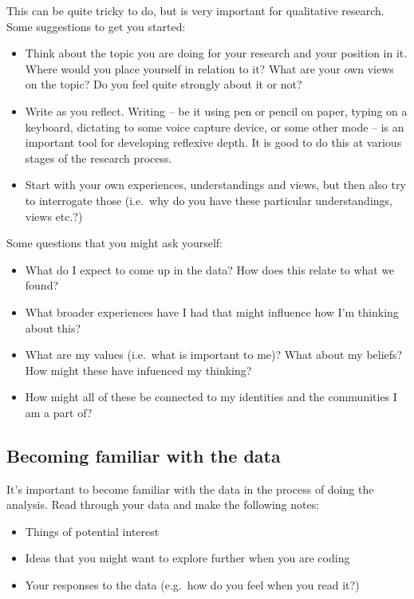 \documentclass[
  english,
  letterpaper,
  DIV=11,
  numbers=noendperiod]{scrreprt}
\providecommand{\tightlist}{%
  \setlength{\itemsep}{0pt}\setlength{\parskip}{0pt}}
\begin{document}
This can be quite tricky to do, but is very important for qualitative
research. Some suggestions to get you started:

\begin{itemize}
\tightlist
\item
  Think about the topic you are doing for your research and your
  position in it. Where would you place yourself in relation to it? What
  are your own views on the topic? Do you feel quite strongly about it
  or not?
\item
  Write as you reflect. Writing -- be it using pen or pencil on paper,
  typing on a keyboard, dictating to some voice capture device, or some
  other mode -- is an important tool for developing reflexive depth. It
  is good to do this at various stages of the research process.
\item
  Start with your own experiences, understandings and views, but then
  also try to interrogate those (i.e.~why do you have these particular
  understandings, views etc.?)
\end{itemize}

Some questions that you might ask yourself:

\begin{itemize}
\tightlist
\item
  What do I expect to come up in the data? How does this relate to what
  we found?
\item
  What broader experiences have I had that might influence how I'm
  thinking about this?
\item
  What are my values (i.e.~what is important to me)? What about my
  beliefs? How might these have infuenced my thinking?
\item
  How might all of these be connected to my identities and the
  communities I am a part of?
\end{itemize}

\subsection{Becoming familiar with the
data}\label{becoming-familiar-with-the-data}

It's important to become familiar with the data in the process of doing
the analysis. Read through your data and make the following notes:

\begin{itemize}
\tightlist
\item
  Things of potential interest
\item
  Ideas that you might want to explore further when you are coding
\item
  Your responses to the data (e.g.~how do you feel when you read it?)
\end{itemize}
\end{document}
